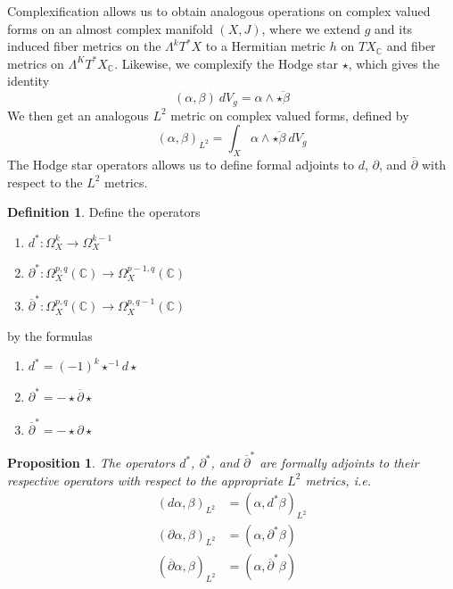 \documentclass[psamsfonts, 12pt]{amsart}
\newtheorem{prop}[thm]{Proposition}
\theoremstyle{definition}
\newtheorem{defn}[thm]{Definition}
\theoremstyle{remark}
\newcommand{\C}{\mathbb{C}}
\newcommand{\dbar}{\overline{\partial}}
\newcommand{\inv}{^{-1}}
\begin{document}
Complexification allows us to obtain analogous operations on complex valued
forms on an almost complex manifold $(X,J)$, where we extend $g$ and its induced fiber
metrics on the $\Lambda^kT^*X$ to a Hermitian metric $h$ on $TX_\C$ and fiber metrics
on $\Lambda^KT^*X_\C$. Likewise, we complexify the Hodge star $\star$, which gives the
identity
\[
(\alpha,\beta)~dV_g = \alpha \wedge \overline{\star\beta}
\]
We then get an analogous $L^2$ metric on complex valued forms, defined by
\[
(\alpha,\beta)_{L^2} = \int_X \alpha \wedge \overline{\star\beta} ~dV_g
\]
The Hodge star operators allows us to define formal adjoints to $d$, $\partial$, and
$\dbar$ with respect to the $L^2$ metrics.
%
\begin{defn}
Define the operators
\begin{enumerate}
  \item $d^*: \Omega_X^k \to \Omega_X^{k-1}$
  \item $\partial^* : \Omega_X^{p,q}(\C) \to \Omega_X^{p-1,q}(\C)$
  \item $\dbar^* : \Omega_X^{p,q}(\C) \to \Omega_X^{p,q-1}(\C)$
\end{enumerate}
by the formulas
\begin{enumerate}
  \item $d^* = (-1)^k\star\inv d\star$
  \item $\partial^* = -\star\dbar\star$
  \item $\dbar^* = -\star\partial\star$
\end{enumerate}
\end{defn}
%
\begin{prop}
The operators $d^*$, $\partial^*$, and $\dbar^*$ are formally adjoints to their
respective operators with respect to the appropriate $L^2$ metrics, i.e.
\begin{align*}
(d\alpha,\beta)_{L^2} &= (\alpha, d^*\beta)_{L^2} \\
(\partial\alpha,\beta)_{L^2} &= (\alpha,\partial^*\beta) \\
(\dbar\alpha,\beta)_{L^2} &= (\alpha, \dbar^*\beta)
\end{align*}
\end{prop}
%
\end{document}
